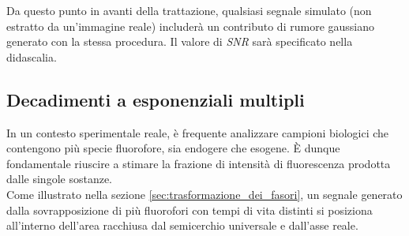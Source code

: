 Da questo punto in avanti della trattazione, qualsiasi segnale simulato (non estratto da un'immagine reale) includerà un contributo di rumore gaussiano generato con la stessa procedura. Il valore di \textit{SNR} sarà specificato nella didascalia.\\





\subsection{Decadimenti a esponenziali multipli}
\label{sec:generazione_di_decadimenti_a_exp_multipli}


In un contesto sperimentale reale, è frequente analizzare campioni biologici che contengono più specie fluorofore, sia endogere che esogene. È dunque fondamentale riuscire a stimare la frazione di intensità di fluorescenza prodotta dalle singole sostanze.\\
Come illustrato nella sezione \ref{sec:trasformazione_dei_fasori}, un segnale generato dalla sovrapposizione di più fluorofori con tempi di vita distinti si posiziona all'interno dell'area racchiusa dal semicerchio universale e dall'asse reale.


